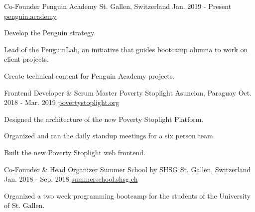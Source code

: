 

\begin{cventries}
  \cventry
    {Co-Founder} %
    {Penguin Academy} %
    {St. Gallen, Switzerland} %
    {Jan. 2019 - Present} %
    {\href{https://penguin.academy}{penguin.academy}} %
    {
      \begin{cvitems} %
      \item {Develop the Penguin strategy.}
      \item {Lead of the PenguinLab, an initiative that guides bootcamp alumna to work on client projects.}
      \item {Create technical content for Penguin Academy projects.}
      \end{cvitems}
    }
  \cventry
    {Frontend Developer \& Scrum Master} %
    {Poverty Stoplight} %
    {Asuncion, Paraguay} %
    {Oct. 2018 - Mar. 2019} %
    {\href{https://povertystoplight.org}{povertystoplight.org}} %
    {
      \begin{cvitems} %
      \item {Designed the architecture of the new Poverty Stoplight Platform.}
      \item {Organized and ran the daily standup meetings for a six person team.}
      \item {Built the new Poverty Stoplight web frontend.}
      \end{cvitems}
    }
  \cventry
    {Co-Founder \& Head Organizer} %
    {Summer School by SHSG} %
    {St. Gallen, Switzerland} %
    {Jan. 2018 - Sep. 2018} %
    {\href{https://summerschool.shsg.ch}{summerschool.shsg.ch}} %
    {
      \begin{cvitems} %
      \item {Organized a two week programming bootcamp for the students of the University of St. Gallen.}

\end{cvitems}}
\end{cventries}
